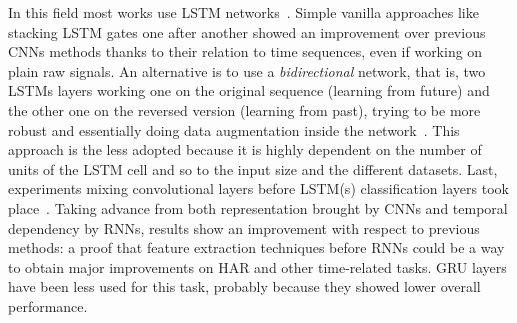 In this field most works use LSTM networks~\cite{Guan-LSTM-wearables}.
Simple vanilla approaches like stacking LSTM gates one after another showed an improvement over previous CNNs methods thanks to their relation to time sequences, even if working on plain raw signals.
An alternative is to use a \textit{bidirectional} network, that is, two LSTMs layers working one on the original sequence (learning from future) and the other one on the reversed version (learning from past), trying to be more robust and essentially doing data augmentation inside the network~\cite{Hammerla-DeepConvRec}.
This approach is the less adopted because it is highly dependent on the number of units of the LSTM cell and so to the input size and the different datasets.
Last, experiments mixing convolutional layers before LSTM(s) classification layers took place~\cite{Ordonez-CNN-LSTM}.
Taking advance from both representation brought by CNNs and temporal dependency by RNNs, results show an improvement with respect to previous methods: a proof that feature extraction techniques before RNNs could be a way to obtain major improvements on HAR and other time-related tasks.
GRU layers have been less used for this task, probably because they showed lower overall performance\cite{Park-DNN-smartmultisensor,Arifoglu-RNN-HAR}.
